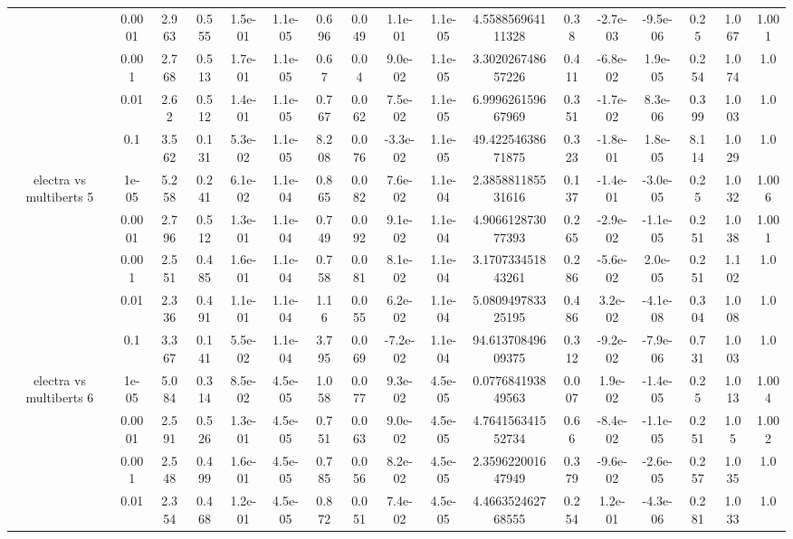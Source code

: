 \begin{tabular}{|c|c|c|c|c|c|c|c|c|c|c|c|c|c|c|c|c|}
 & 0.0001 & 2.963 & 0.555 & 1.5e-01 & 1.1e-05 & 0.696 & 0.049 & 1.1e-01 & 1.1e-05 & 4.558856964111328 & 0.38 & -2.7e-03 & -9.5e-06 & 0.25 & 1.067 & 1.001 \\
 & 0.001 & 2.768 & 0.513 & 1.7e-01 & 1.1e-05 & 0.67 & 0.04 & 9.0e-02 & 1.1e-05 & 3.302026748657226 & 0.411 & -6.8e-02 & 1.9e-05 & 0.254 & 1.074 & 1.0 \\
 & 0.01 & 2.62 & 0.512 & 1.4e-01 & 1.1e-05 & 0.767 & 0.062 & 7.5e-02 & 1.1e-05 & 6.999626159667969 & 0.351 & -1.7e-02 & 8.3e-06 & 0.399 & 1.003 & 1.0 \\
 & 0.1 & 3.562 & 0.131 & 5.3e-02 & 1.1e-05 & 8.208 & 0.076 & -3.3e-02 & 1.1e-05 & 49.42254638671875 & 0.323 & -1.8e-01 & 1.8e-05 & 8.114 & 1.029 & 1.0 \\
\hline
\multirow{5}{*}{electra  vs multiberts 5} & 1e-05 & 5.258 & 0.241 & 6.1e-02 & 1.1e-04 & 0.865 & 0.082 & 7.6e-02 & 1.1e-04 & 2.385881185531616 & 0.137 & -1.4e-01 & -3.0e-05 & 0.25 & 1.032 & 1.006 \\
 & 0.0001 & 2.796 & 0.512 & 1.3e-01 & 1.1e-04 & 0.749 & 0.092 & 9.1e-02 & 1.1e-04 & 4.906612873077393 & 0.265 & -2.9e-02 & -1.1e-05 & 0.251 & 1.038 & 1.001 \\
 & 0.001 & 2.551 & 0.485 & 1.6e-01 & 1.1e-04 & 0.758 & 0.081 & 8.1e-02 & 1.1e-04 & 3.170733451843261 & 0.286 & -5.6e-02 & 2.0e-05 & 0.251 & 1.102 & 1.0 \\
 & 0.01 & 2.336 & 0.491 & 1.1e-01 & 1.1e-04 & 1.16 & 0.055 & 6.2e-02 & 1.1e-04 & 5.080949783325195 & 0.486 & 3.2e-02 & -4.1e-08 & 0.304 & 1.008 & 1.0 \\
 & 0.1 & 3.367 & 0.141 & 5.5e-02 & 1.1e-04 & 3.795 & 0.069 & -7.2e-02 & 1.1e-04 & 94.61370849609375 & 0.312 & -9.2e-02 & -7.9e-06 & 0.731 & 1.003 & 1.0 \\
\hline
\multirow{5}{*}{electra  vs multiberts 6} & 1e-05 & 5.084 & 0.314 & 8.5e-02 & 4.5e-05 & 1.058 & 0.077 & 9.3e-02 & 4.5e-05 & 0.077684193849563 & 0.007 & 1.9e-02 & -1.4e-05 & 0.25 & 1.013 & 1.004 \\
 & 0.0001 & 2.591 & 0.526 & 1.3e-01 & 4.5e-05 & 0.751 & 0.063 & 9.0e-02 & 4.5e-05 & 4.764156341552734 & 0.66 & -8.4e-02 & -1.1e-05 & 0.251 & 1.05 & 1.002 \\
 & 0.001 & 2.548 & 0.499 & 1.6e-01 & 4.5e-05 & 0.785 & 0.056 & 8.2e-02 & 4.5e-05 & 2.359622001647949 & 0.379 & -9.6e-02 & -2.6e-05 & 0.257 & 1.035 & 1.0 \\
 & 0.01 & 2.354 & 0.468 & 1.2e-01 & 4.5e-05 & 0.872 & 0.051 & 7.4e-02 & 4.5e-05 & 4.466352462768555 & 0.254 & 1.2e-01 & -4.3e-06 & 0.281 & 1.033 & 1.0 \\

\end{tabular}
